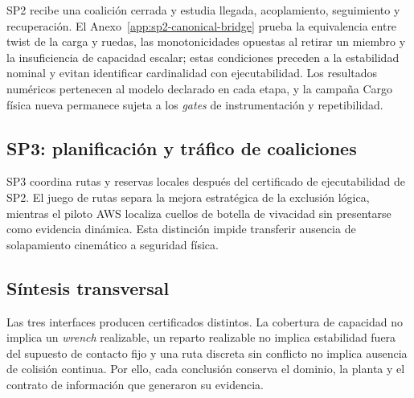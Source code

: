 SP2 recibe una coalición cerrada y estudia llegada, acoplamiento, seguimiento y recuperación. El Anexo~\ref{app:sp2-canonical-bridge} prueba la equivalencia entre twist de la carga y ruedas, las monotonicidades opuestas al retirar un miembro y la insuficiencia de capacidad escalar; estas condiciones preceden a la estabilidad nominal y evitan identificar cardinalidad con ejecutabilidad. Los resultados numéricos pertenecen al modelo declarado en cada etapa, y la campaña Cargo física nueva permanece sujeta a los \emph{gates} de instrumentación y repetibilidad.





\clearpage
\subsection{SP3: planificación y tráfico de coaliciones}
\label{subsec:sp3}

SP3 coordina rutas y reservas locales después del certificado de ejecutabilidad de SP2. El juego de rutas separa la mejora estratégica de la exclusión lógica, mientras el piloto AWS localiza cuellos de botella de vivacidad sin presentarse como evidencia dinámica. Esta distinción impide transferir ausencia de solapamiento cinemático a seguridad física.





\clearpage
\subsection{Síntesis transversal}
\label{subsec:cross-discussion}

Las tres interfaces producen certificados distintos. La cobertura de capacidad no implica un \emph{wrench} realizable, un reparto realizable no implica estabilidad fuera del supuesto de contacto fijo y una ruta discreta sin conflicto no implica ausencia de colisión continua. Por ello, cada conclusión conserva el dominio, la planta y el contrato de información que generaron su evidencia.

